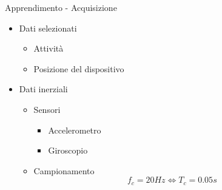 \begin{tframe}{Apprendimento - Acquisizione}

    \begin{minipage}{0.60\textwidth}

        \begin{itemize}

            \item Dati selezionati
                \begin{itemize}
                    \item Attività
                    \item Posizione del dispositivo
                \end{itemize}

            \item Dati inerziali 
                \begin{itemize}
                    \item Sensori
                        \begin{itemize}
                            \item Accelerometro
                            \item Giroscopio
                        \end{itemize}
                    \item Campionamento
                        $$f_c = 20Hz \Longleftrightarrow T_c = 0.05s$$
                \end{itemize}
        \end{itemize}

    \end{minipage}%
    \hfill
    \begin{minipage}{0.35\textwidth}
        

\end{minipage}
\end{tframe}
